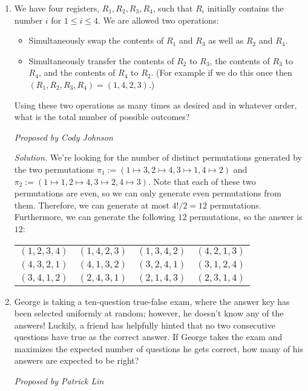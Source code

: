 \documentclass[10pt]{article}
\newcommand{\proposed}[1]
{
\vspace{5pt}
\noindent\textit{Proposed by #1}
}
\newcommand{\solution}
{
\vspace{5pt}
\noindent\textit{Solution.}\qquad
}
\begin{document}
\begin{enumerate}
\item We have four registers, $R_1,R_2,R_3,R_4$, such that $R_i$ initially contains the number $i$ for $1\le i\le4$. We are allowed two operations:

\begin{itemize}
\item Simultaneously swap the contents of $R_1$ and $R_3$ as well as $R_2$ and $R_4$.

\item Simultaneously transfer the contents of $R_2$ to $R_3$, the contents of $R_3$ to $R_4$, and the contents of $R_4$ to $R_2$. (For example if we do this once then $(R_1,R_2,R_3,R_4)=(1,4,2,3)$.)
\end{itemize}

Using these two operations as many times as desired and in whatever order, what is the total number of possible outcomes?

\proposed{Cody Johnson}

\solution We're looking for the number of distinct permutations generated by the two permutations $\pi_1:=(1\mapsto3,2\mapsto4,3\mapsto1,4\mapsto2)$ and $\pi_2:=(1\mapsto1,2\mapsto4,3\mapsto2,4\mapsto3)$. Note that each of these two permutations are even, so we can only generate even permutations from them. Therefore, we can generate at most $4!/2=12$ permutations. Furthermore, we can generate the following $12$ permutations, so the answer is $\boxed{12}$:

\begin{center}
\begin{tabular}{cccc}
$(1,2,3,4)$ & $(1,4,2,3)$ & $(1,3,4,2)$ & $(4,2,1,3)$ \\
$(4,3,2,1)$ & $(4,1,3,2)$ & $(3,2,4,1)$ & $(3,1,2,4)$ \\
$(3,4,1,2)$ & $(2,4,3,1)$ & $(2,1,4,3)$ & $(2,3,1,4)$
\end{tabular}
\end{center}

\item George is taking a ten-question true-false exam, where the answer key has been selected uniformly at random; however, he doesn't know any of the answers! Luckily, a friend has helpfully hinted that no two consecutive questions have true as the correct answer. If George takes the exam and maximizes the expected number of questions he gets correct, how many of his answers are expected to be right?

\proposed{Patrick Lin}


\end{enumerate}
\end{document}
